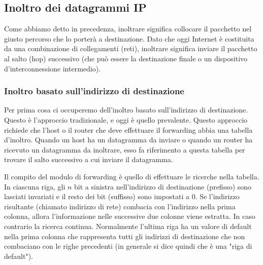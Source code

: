 \subsection{Inoltro dei datagrammi IP}
Come abbiamo detto in precedenza, inoltrare significa collocare il pacchetto nel giusto percorso che lo porterà a destinazione. Dato che oggi Internet è costituita da una combinazione di collegamenti (reti), inoltrare significa inviare il pacchetto al salto (hop) successivo (che può essere la destinazione finale o un dispositivo d'interconnessione intermedio).

\subsubsection{Inoltro basato sull'indirizzo di destinazione}
Per prima cosa ci occuperemo dell'inoltro basato sull'indirizzo di destinazione. Questo è l'approccio tradizionale, e oggi è quello prevalente. Questo approccio richiede che l'host o il router che deve effettuare il forwarding abbia una tabella d'inoltro. Quando un host ha un datagramma da inviare o quando un router ha ricevuto un datagramma da inoltrare, esso fa riferimento a questa tabella per trovare il salto successivo a cui inviare il datagramma.


Il compito del modulo di forwarding è quello di effettuare le ricerche nella tabella. In ciascuna riga, gli $n$ bit a sinistra nell'indirizzo di destinazione (prefisso) sono lasciati invariati e il resto dei bit (suffisso) sono impostati a 0. Se l'indirizzo risultante (chiamato indirizzo di rete) combacia con l'indirizzo nella prima colonna, allora l'informazione nelle successive due colonne viene estratta. In caso contrario la ricerca continua. Normalmente l'ultima riga ha un valore di default nella prima colonna che rappresenta tutti gli indirizzi di destinazione che non combaciano con le righe precedenti (in generale si dice quindi che è una "riga di default").

